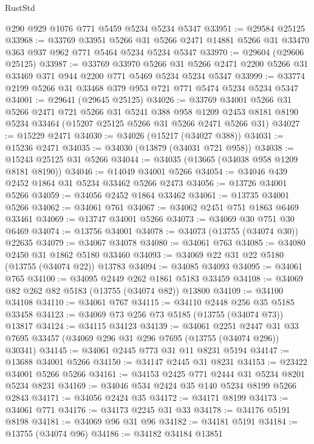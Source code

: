 \begin{lexlean}{RustStd}
\begin{coremodule}
    @290
    @929
    @1076
    @771
    @5459
    @5234
    @5234
    @5347
@33951 := @29584 @25125
@33968 := @33769
    @33951
    @5266
    @31
    @5266
    @2471
    @14881
    @5266
    @31
    @33470
    @363
    @937
    @962
    @771
    @5464
    @5234
    @5234
    @5347
@33970 := @29604 (@29606 @25125)
@33987 := @33769
    @33970
    @5266
    @31
    @5266
    @2471
    @2200
    @5266
    @31
    @33469
    @371
    @944
    @2200
    @771
    @5469
    @5234
    @5234
    @5347
@33999 := @33774 @2199 @5266 @31 @33468 @379 @953 @721 @771 @5474 @5234 @5234 @5347
@34001 := @29641 (@29645 @25125)
@34026 := @33769
    @34001
    @5266
    @31
    @5266
    @2471
    @721
    @5266
    @31
    @5241
    @388
    @958
    @1209
    @2453
    @8181
    @8190
    @5234
    @33464
    (@15207 @25125 @5266 @31 @5266 @2471 @5266 @31)
@34027 := @15229 @2471
@34030 := @34026 (@15217 (@34027 @388))
@34031 := @15236 @2471
@34035 := @34030 (@13879 (@34031 @721 @958))
@34038 := @15243 @25125 @31 @5266
@34044 := @34035 (@13665 (@34038 @958 @1209 @8181 @8190))
@34046 := @14049 @34001 @5266
@34054 := @34046 @439 @2452 @1864 @31 @5234 @33462 @5266 @2473
@34056 := @13726 @34001 @5266
@34059 := @34056 @2452 @1864 @33462
@34061 := @13735 @34001 @5266
@34062 := @34061 @761
@34067 := @34062 @2451 @751 @1863 @6469 @33461
@34069 := @13747 @34001 @5266
@34073 := @34069 @30 @751 @30 @6469
@34074 := @13756 @34001
@34078 := @34073 (@13755 (@34074 @30)) @22635
@34079 := @34067 @34078
@34080 := @34061 @763
@34085 := @34080 @2450 @31 @1862 @5180 @33460
@34093 := @34069 @22 @31 @22 @5180 (@13755 (@34074 @22)) @13783
@34094 := @34085 @34093
@34095 := @34061 @765
@34100 := @34095 @2449 @262 @1861 @5183 @33459
@34108 := @34069 @82 @262 @82 @5183 (@13755 (@34074 @82)) @13800
@34109 := @34100 @34108
@34110 := @34061 @767
@34115 := @34110 @2448 @256 @35 @5185 @33458
@34123 := @34069 @73 @256 @73 @5185 (@13755 (@34074 @73)) @13817
@34124 := @34115 @34123
@34139 := @34061
    @2251
    @2447
    @31
    @33
    @7695
    @33457
    (@34069 @296 @31 @296 @7695 (@13755 (@34074 @296)) @30341)
@34145 := @34061 @2445 @773 @31 @11 @8231 @5194
@34147 := @13688 @34001 @5266
@34150 := @34147 @2445 @31 @8231
@34153 := @23422 @34001 @5266 @5266
@34161 := @34153 @2425 @771 @2444 @31 @5234 @8201 @5234 @8231
@34169 := @34046 @534 @2424 @35 @140 @5234 @8199 @5266 @2843
@34171 := @34056 @2424 @35
@34172 := @34171 @8199
@34173 := @34061 @771
@34176 := @34173 @2245 @31 @33
@34178 := @34176 @5191 @8198
@34181 := @34069 @96 @31 @96
@34182 := @34181 @5191
@34184 := @13755 (@34074 @96)
@34186 := @34182 @34184 @13851

\end{coremodule}
\end{lexlean}
